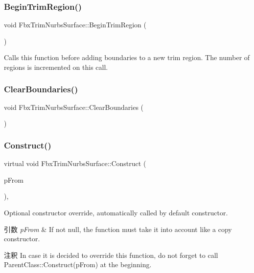 \subsubsection{\texorpdfstring{Begin\+Trim\+Region()}{BeginTrimRegion()}}
{\footnotesize\ttfamily void Fbx\+Trim\+Nurbs\+Surface\+::\+Begin\+Trim\+Region (\begin{DoxyParamCaption}{ }\end{DoxyParamCaption})}

Calls this function before adding boundaries to a new trim region. The number of regions is incremented on this call. \mbox{\label{class_fbx_trim_nurbs_surface_a9b06224c2a2f1601a88a3e26f6060cab}} 
\subsubsection{\texorpdfstring{Clear\+Boundaries()}{ClearBoundaries()}}
{\footnotesize\ttfamily void Fbx\+Trim\+Nurbs\+Surface\+::\+Clear\+Boundaries (\begin{DoxyParamCaption}{ }\end{DoxyParamCaption})}

\mbox{\label{class_fbx_trim_nurbs_surface_a95ea54578a57e9038ae67cb2b6b26f82}} 
\subsubsection{\texorpdfstring{Construct()}{Construct()}}
{\footnotesize\ttfamily virtual void Fbx\+Trim\+Nurbs\+Surface\+::\+Construct (\begin{DoxyParamCaption}\item[{const \hyperlink{class_fbx_object}{Fbx\+Object} $\ast$}]{p\+From }\end{DoxyParamCaption})\hspace{0.3cm}{\ttfamily [protected]}, {\ttfamily [virtual]}}

Optional constructor override, automatically called by default constructor. 
\begin{DoxyParams}{引数}
{\em p\+From} & If not null, the function must take it into account like a copy constructor. \\
\hline
\end{DoxyParams}
\begin{DoxyRemark}{注釈}
In case it is decided to override this function, do not forget to call Parent\+Class\+::\+Construct(p\+From) at the beginning. 
\end{DoxyRemark}


